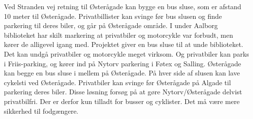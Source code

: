 Ved Stranden vej retning til Østerågade kan bygge en bus sluse, som er afstand 10 meter til Østerågade. Privatbillister kan svinge før bus slusen og finde parkering til deres biler, og går på Østerågade område. 
I under Aalborg biblioteket har skilt markering at privatbiler og motorcykle var forbudt, men kører de alligevel igang med. Projektet giver en bus sluse til at unde biblioteket. Det kan undgå privatbiler og motorcykle meget virksom. Og privatbiler kan parks i Friis-parking, og kører ind på Nytorv parkering i Føtex og Salling.  
Østerågade kan begge en bus sluse i mellem på Østerågade. På hver side af slusen kan lave cykelsti ved Østerågade. Privatbiler kan svinge før Østerågade på Algade til parkering deres biler. 
Disse løsning forsøg på at gøre Nytorv/Østerågade delvist privatbilfri. Der er derfor kun tilladt for busser og cyklister. Det må være mere sikkerhed til fodgængere.
